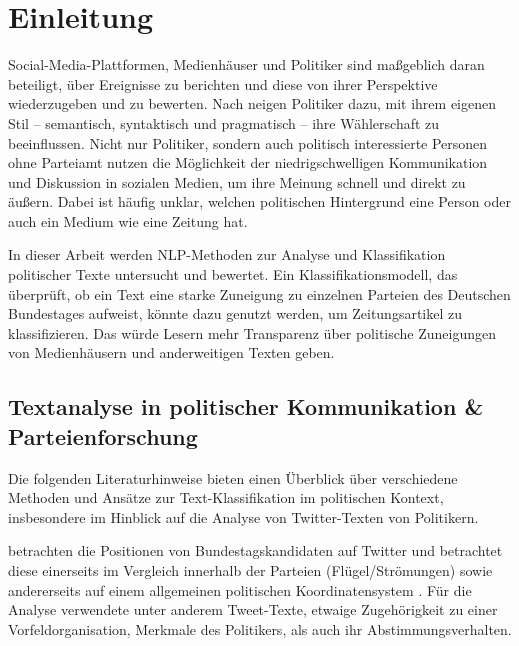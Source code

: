 
\chapter{Einleitung} \label{ch:introduction}

Social-Media-Plattformen, Medienhäuser und Politiker sind maßgeblich daran beteiligt, über Ereignisse zu berichten und diese von ihrer Perspektive wiederzugeben und zu bewerten. Nach \textcite{willeke_soziale_2019} neigen Politiker dazu, mit ihrem eigenen Stil -- semantisch, syntaktisch und pragmatisch -- ihre Wählerschaft zu beeinflussen. Nicht nur Politiker, sondern auch politisch interessierte Personen ohne Parteiamt nutzen die Möglichkeit der niedrigschwelligen Kommunikation und Diskussion in sozialen Medien, um ihre Meinung schnell und direkt zu äußern. Dabei ist häufig unklar, welchen politischen Hintergrund eine Person oder auch ein Medium wie eine Zeitung hat.

In dieser Arbeit werden \ac{NLP}-Methoden zur Analyse und Klassifikation politischer Texte untersucht und bewertet. Ein Klassifikationsmodell, das überprüft, ob ein Text eine starke Zuneigung zu einzelnen Parteien des Deutschen Bundestages aufweist, könnte dazu genutzt werden, um Zeitungsartikel zu klassifizieren. Das würde Lesern mehr Transparenz über politische Zuneigungen von Medienhäusern und anderweitigen Texten geben.

\section{Textanalyse in politischer Kommunikation \& Parteienforschung} \label{sec:introductionTextanalysis}

Die folgenden Literaturhinweise bieten einen Überblick über verschiedene Methoden und Ansätze zur Text-Klassifikation im politischen Kontext, insbesondere im Hinblick auf die Analyse von Twitter-Texten von Politikern.

\textcite{saltzer_bundestagswahl_2022} betrachten die Positionen von Bundestagskandidaten auf Twitter und betrachtet diese einerseits im Vergleich innerhalb der Parteien (Flügel/Strömungen) sowie andererseits auf einem allgemeinen politischen Koordinatensystem \autocite{saltzer_bundestagswahl_2022, saltzer_finding_2022}. Für die Analyse verwendete \textcite{saltzer_finding_2022} unter anderem Tweet-Texte, etwaige Zugehörigkeit zu einer Vorfeldorganisation, Merkmale des Politikers, als auch ihr Abstimmungsverhalten.

